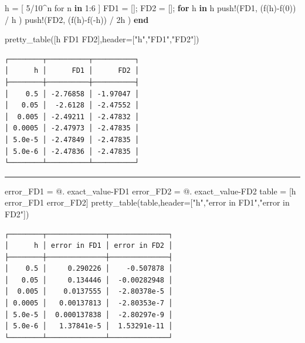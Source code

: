 \documentclass[
]{article}
\newenvironment{Shaded}{\begin{snugshade}}{\end{snugshade}}
\newcommand{\ControlFlowTok}[1]{\textcolor[rgb]{0.00,0.23,0.31}{\textbf{#1}}}
\newcommand{\FloatTok}[1]{\textcolor[rgb]{0.68,0.00,0.00}{#1}}
\newcommand{\FunctionTok}[1]{\textcolor[rgb]{0.28,0.35,0.67}{#1}}
\newcommand{\KeywordTok}[1]{\textcolor[rgb]{0.00,0.23,0.31}{\textbf{#1}}}
\newcommand{\NormalTok}[1]{\textcolor[rgb]{0.00,0.23,0.31}{#1}}
\newcommand{\OperatorTok}[1]{\textcolor[rgb]{0.37,0.37,0.37}{#1}}
\newcommand{\StringTok}[1]{\textcolor[rgb]{0.13,0.47,0.30}{#1}}
\begin{document}
\begin{Shaded}
\begin{Highlighting}[]
\NormalTok{h }\OperatorTok{=}\NormalTok{ [ }\FloatTok{5}\OperatorTok{/}\FloatTok{10}\OperatorTok{\^{}}\NormalTok{n for n }\KeywordTok{in} \FloatTok{1}\OperatorTok{:}\FloatTok{6}\NormalTok{ ]}
\NormalTok{FD1 }\OperatorTok{=}\NormalTok{ []; FD2 }\OperatorTok{=}\NormalTok{ [];}
\ControlFlowTok{for}\NormalTok{ h }\KeywordTok{in}\NormalTok{ h }
    \FunctionTok{push!}\NormalTok{(FD1, (}\FunctionTok{f}\NormalTok{(h)}\FunctionTok{{-}f}\NormalTok{(}\FloatTok{0}\NormalTok{)) }\OperatorTok{/}\NormalTok{ h )}
    \FunctionTok{push!}\NormalTok{(FD2, (}\FunctionTok{f}\NormalTok{(h)}\FunctionTok{{-}f}\NormalTok{(}\OperatorTok{{-}}\NormalTok{h)) }\OperatorTok{/} \FloatTok{2}\NormalTok{h )}
\ControlFlowTok{end}

\FunctionTok{pretty\_table}\NormalTok{([h FD1 FD2],header}\OperatorTok{=}\NormalTok{[}\StringTok{"h"}\NormalTok{,}\StringTok{"FD1"}\NormalTok{,}\StringTok{"FD2"}\NormalTok{])}
\end{Highlighting}
\end{Shaded}

\begin{verbatim}
┌────────┬──────────┬──────────┐
│      h │      FD1 │      FD2 │
├────────┼──────────┼──────────┤
│    0.5 │ -2.76858 │ -1.97047 │
│   0.05 │  -2.6128 │ -2.47552 │
│  0.005 │ -2.49211 │ -2.47832 │
│ 0.0005 │ -2.47973 │ -2.47835 │
│ 5.0e-5 │ -2.47849 │ -2.47835 │
│ 5.0e-6 │ -2.47836 │ -2.47835 │
└────────┴──────────┴──────────┘
\end{verbatim}

\begin{center}\rule{0.5\linewidth}{0.5pt}\end{center}

\begin{Shaded}
\begin{Highlighting}[]
\NormalTok{error\_FD1 }\OperatorTok{=}\NormalTok{ @. exact\_value}\OperatorTok{{-}}\NormalTok{FD1}
\NormalTok{error\_FD2 }\OperatorTok{=}\NormalTok{ @. exact\_value}\OperatorTok{{-}}\NormalTok{FD2}
\NormalTok{table }\OperatorTok{=}\NormalTok{ [h error\_FD1 error\_FD2]}
\FunctionTok{pretty\_table}\NormalTok{(table,header}\OperatorTok{=}\NormalTok{[}\StringTok{"h"}\NormalTok{,}\StringTok{"error in FD1"}\NormalTok{,}\StringTok{"error in FD2"}\NormalTok{])}
\end{Highlighting}
\end{Shaded}

\begin{verbatim}
┌────────┬──────────────┬──────────────┐
│      h │ error in FD1 │ error in FD2 │
├────────┼──────────────┼──────────────┤
│    0.5 │     0.290226 │    -0.507878 │
│   0.05 │     0.134446 │  -0.00282948 │
│  0.005 │    0.0137555 │  -2.80378e-5 │
│ 0.0005 │   0.00137813 │  -2.80353e-7 │
│ 5.0e-5 │  0.000137838 │  -2.80297e-9 │
│ 5.0e-6 │   1.37841e-5 │  1.53291e-11 │
└────────┴──────────────┴──────────────┘
\end{verbatim}
\end{document}
